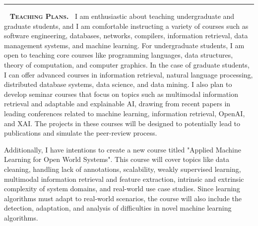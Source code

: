 \documentclass[9pt]{article}
\makeatletter
\def \paragraph {%
    \@startsection{paragraph}%
        {4}%
        \z@%
        {0.1em}
        {-\fontdimen 6 \font}%
        {\normalfont \bfseries}%
    }
\makeatother
\begin{document}

\medskip
\noindent\rule{2cm}{4pt}~\textbf{\textsc{ Teaching Plans.~}}
I am enthusiastic about teaching undergraduate and graduate students, and I am comfortable instructing a variety of courses such as software engineering, databases, networks, compilers, information retrieval, data management systems, and machine learning. For undergraduate students, I am open to teaching core courses like programming languages, data structures, theory of computation, and computer graphics. In the case of graduate students, I can offer advanced courses in information retrieval, natural language processing, distributed database systems, data science, and data mining.
%
I also plan to develop seminar courses that focus on topics such as multimodal information retrieval and adaptable and explainable AI, drawing from recent papers in leading conferences related to machine learning, information retrieval, OpenAI, and XAI. The projects in these courses will be designed to potentially lead to publications and simulate the peer-review process.

Additionally, I have intentions to create a new course titled "Applied Machine Learning for Open World Systems". 
This course will cover topics like data cleaning, handling lack of annotations, scalability, weakly supervised learning, multimodal information retrieval and feature extraction, intrinsic and extrinsic complexity of system domains, and real-world use case studies. Since learning algorithms must adapt to real-world scenarios, the course will also include the detection, adaptation, and analysis of difficulties in novel machine learning algorithms.

\end{document}
